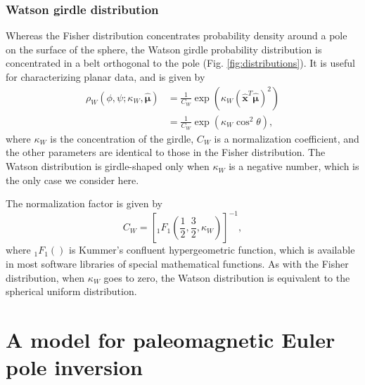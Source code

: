 \documentclass[]{agujournal2019}
\begin{document}
\subsubsection*{Watson girdle distribution}
Whereas the Fisher distribution concentrates probability density around a pole on the surface of the sphere, the Watson girdle probability distribution is concentrated in a belt orthogonal to the pole (Fig. \ref{fig:distributions}). It is useful for characterizing planar data, and is given by
\begin{equation}
  \begin{aligned}
  \rho_W(\phi, \psi; \kappa_W, \hat{\mathbf{\mu}}) 
  &= \frac{1}{C_W} \exp \left( \kappa_W (\hat{\mathbf{x}}^T \hat{\mathbf{\mu}})^2 \right) \\
  &= \frac{1}{C_W} \exp \left( \kappa_W \cos^2 \theta \right),
  \end{aligned}
\label{eq:watson}
\end{equation}
where $\kappa_W$ is the concentration of the girdle, $C_W$ is a normalization coefficient, and the other parameters are identical to those in the Fisher distribution. The Watson distribution is girdle-shaped only when $\kappa_W$ is a negative number, which is the only case we consider here.

The normalization factor is given by
\begin{equation}
  C_W = \left[ {}_1 F_1 \left( \frac{1}{2}, \frac{3}{2}, \kappa_W \right) \right]^{-1},
\end{equation}
where ${}_1 F_1()$ is Kummer's confluent hypergeometric function, which is available in most software libraries of special mathematical functions. As with the Fisher distribution, when $\kappa_W$ goes to zero,  the Watson distribution is equivalent to the spherical uniform distribution.

\section*{A model for paleomagnetic Euler pole inversion}
\label{sec:model}
\end{document}
